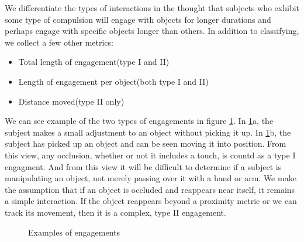 \documentclass[11pt]{article}
\begin{document}
We differentiate the types of interactions in the thought that subjects who exhibit some type of compulsion will engage with objects for longer durations and perhaps engage with specific objects longer than others. In addition to classifying, we collect a few other metrics:
\begin{itemize}
\item Total length of engagement(type I and II)
\item Length of engagement per object(both type I and II)
\item Distance moved(type II only)
\end{itemize}
We can see example of the two types of engagements in figure \ref{engagement}. In \ref{engagement}a, the subject makes a small adjustment to an object without picking it up. In \ref{engagement}b, the subject has picked up an object and can be seen moving it into position. From this view, any occlusion, whether or not it includes a touch, is countd as a type I engagment. And from this view it will be difficult to determine if a subject is manipulating an object, not merely passing over it with a hand or arm. We make the assumption that if an object is occluded and reappears near itself, it remains a simple interaction. If the object reappears beyond a proximity metric or we can track its movement, then it is a complex, type II engagement.
\begin{figure}%
    \centering
    \qquad
    \caption{Examples of engagements}%
    \label{engagement}%
\end{figure}
\end{document}

